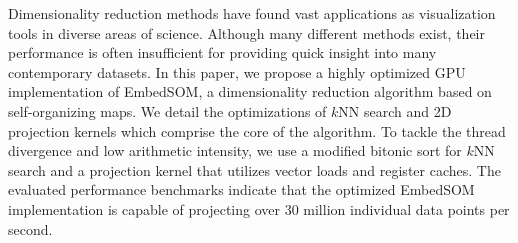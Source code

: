 Dimensionality reduction methods have found vast applications as visualization tools in diverse areas of science.
Although many different methods exist, their performance is often insufficient for providing quick insight into many contemporary datasets.
In this paper, we propose a highly optimized GPU implementation of EmbedSOM, a dimensionality reduction algorithm based on self-organizing maps.
We detail the optimizations of $k$NN search and 2D projection kernels which comprise the core of the algorithm.
To tackle the thread divergence and low arithmetic intensity, we use a modified bitonic sort for $k$NN search and a projection kernel that utilizes vector loads and register caches.
The evaluated performance benchmarks indicate that the optimized EmbedSOM implementation is capable of projecting over 30 million individual data points per second.


